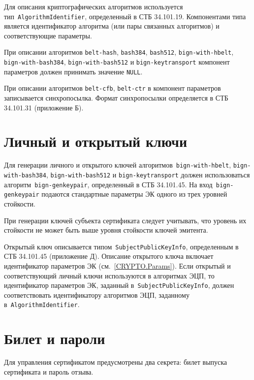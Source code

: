 Для описания криптографических алгоритмов используется 
тип~\texttt{AlgorithmIdentifier}, определенный в СТБ 34.101.19.
Компонентами типа является идентификатор алгоритма (или пары 
связанных алгоритмов) и соответствующие параметры. 

При описании алгоритмов 
\texttt{belt-hash}, \texttt{bash384}, \texttt{bash512},
\texttt{bign-with-hbelt}, \texttt{bign-with-bash384}, 
\texttt{bign-with-bash512} и \texttt{bign-keytransport} компонент параметров 
должен принимать значение \texttt{NULL}.

При описании алгоритмов \texttt{belt-cfb}, \texttt{belt-ctr}
в компонент параметров записывается синхропосылка.
Формат синхропосылки определяется в СТБ 34.101.31 (приложение Б).

\section{Личный и открытый ключи}\label{CRYPTO.Keypair}

Для генерации личного и открытого ключей алгоритмов~\texttt{bign-with-hbelt}, 
\texttt{bign-with-bash384}, \texttt{bign-with-bash512} и 
\texttt{bign-keytransport} должен использоваться 
алгоритм~\texttt{bign-genkeypair}, определенный в СТБ 34.101.45. 
%
На вход~\texttt{bign-genkeypair} подаются стандартные параметры ЭК одного 
из трех уровней стойкости. 


При генерации ключей субъекта сертификата следует учитывать, что 
уровень их стойкости не может быть выше уровня стойкости ключей эмитента.

Открытый ключ описывается типом~\texttt{SubjectPublicKeyInfo}, 
определенным в СТБ 34.101.45 (приложение Д).
%
Описание открытого ключа включает идентификатор параметров ЭК 
(см.~\ref{CRYPTO.Params}). 
%
Если открытый и соответствующий личный ключи используются в алгоритмах 
ЭЦП, то идентификатор параметров ЭК, заданный в~\texttt{SubjectPublicKeyInfo},
должен соответствовать идентификатору алгоритмов ЭЦП, заданному 
в~\texttt{AlgorithmIdentifier}.

\section{Билет и пароли}\label{CRYPTO.Pwd}

Для управления сертификатом предусмотрены два секрета:
билет выпуска сертификата и пароль отзыва. 

